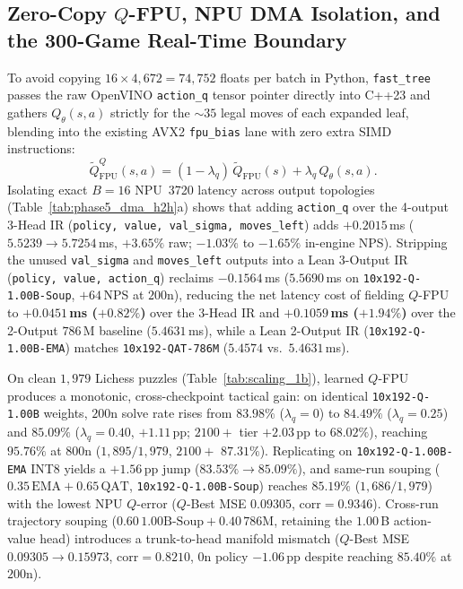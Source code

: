 \documentclass[10pt,twocolumn]{article}
\begin{document}
\subsection{Zero-Copy $Q$-FPU, NPU DMA Isolation, and the 300-Game Real-Time Boundary}
\label{sec:phase5_h2h}
To avoid copying $16 \times 4{,}672 = 74{,}752$ floats per batch in Python, \texttt{fast\_tree} passes the raw OpenVINO \texttt{action\_q} tensor pointer directly into C++23 and gathers $Q_\theta(s,a)$ strictly for the ${\sim}35$ legal moves of each expanded leaf, blending into the existing AVX2 \texttt{fpu\_bias} lane with zero extra SIMD instructions:
\begin{equation}
  \tilde{Q}_{\mathrm{FPU}}^{Q}(s,a) = (1 - \lambda_q)\,\tilde{Q}_{\mathrm{FPU}}(s) + \lambda_q\,Q_\theta(s,a).
  \label{eq:qfpu}
\end{equation}
Isolating exact $B=16$ NPU~3720 latency across output topologies (Table~\ref{tab:phase5_dma_h2h}a) shows that adding \texttt{action\_q} over the 4-output 3-Head IR (\texttt{policy, value, val\_sigma, moves\_left}) adds $+0.2015$\,ms ($5.5239 \to 5.7254$\,ms, $+3.65\%$ raw; $-1.03\%$ to $-1.65\%$ in-engine NPS). Stripping the unused \texttt{val\_sigma} and \texttt{moves\_left} outputs into a Lean 3-Output IR (\texttt{policy, value, action\_q}) reclaims $-0.1564$\,ms ($5.5690$\,ms on \texttt{10x192-Q-1.00B-Soup}, $+64$\,NPS at $200\text{n}$), reducing the net latency cost of fielding $Q$-FPU to \textbf{$+0.0451$\,ms ($+0.82\%$)} over the 3-Head IR and \textbf{$+0.1059$\,ms ($+1.94\%$)} over the 2-Output $786$\,M baseline ($5.4631$\,ms), while a Lean 2-Output IR (\texttt{10x192-Q-1.00B-EMA}) matches \texttt{10x192-QAT-786M} ($5.4574$ vs.\ $5.4631$\,ms).

On clean $1{,}979$ Lichess puzzles (Table~\ref{tab:scaling_1b}), learned $Q$-FPU produces a monotonic, cross-checkpoint tactical gain: on identical \texttt{10x192-Q-1.00B} weights, $200\text{n}$ solve rate rises from $83.98\%$ ($\lambda_q=0$) to $84.49\%$ ($\lambda_q=0.25$) and $85.09\%$ ($\lambda_q=0.40$, $+1.11$\,pp; $2100+$ tier $+2.03$\,pp to $68.02\%$), reaching $95.76\%$ at $800\text{n}$ ($1{,}895/1{,}979$, $2100+$ $87.31\%$). Replicating on \texttt{10x192-Q-1.00B-EMA} INT8 yields a $+1.56$\,pp jump ($83.53\% \to 85.09\%$), and same-run souping ($0.35\,\text{EMA} + 0.65\,\text{QAT}$, \texttt{10x192-Q-1.00B-Soup}) reaches $85.19\%$ ($1{,}686/1{,}979$) with the lowest NPU $Q$-error ($Q$-Best MSE $0.09305$, $\mathrm{corr}=0.9346$). Cross-run trajectory souping ($0.60\,\text{1.00B-Soup} + 0.40\,\text{786M}$, retaining the $1.00$\,B action-value head) introduces a trunk-to-head manifold mismatch ($Q$-Best MSE $0.09305 \to 0.15973$, $\mathrm{corr}=0.8210$, $0\text{n}$ policy $-1.06$\,pp despite reaching $85.40\%$ at $200\text{n}$).
\end{document}
